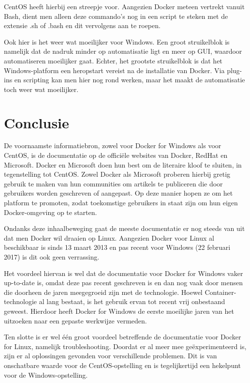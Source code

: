 CentOS heeft hierbij een streepje voor. Aangezien Docker meteen vertrekt vanuit Bash, dient men alleen deze commando's nog in een script te steken met de extensie .sh of .bash en dit vervolgens aan te roepen.

Ook hier is het weer wat moeilijker voor Windows. Een groot struikelblok is namelijk dat de nadruk minder op automatisatie ligt en meer op GUI, waardoor automatiseren moeilijker gaat. Echter, het grootste struikelblok is dat het Windows-platform een heropstart vereist na de installatie van Docker. Via plug-ins en scripting kan men hier nog rond werken, maar het maakt de automatisatie toch weer wat moeilijker.

\section{Conclusie}
De voornaamste informatiebron, zowel voor Docker for Windows als voor CentOS, is de documentatie op de officiële websites van Docker, RedHat en Microsoft. Docker en Microsoft doen hun best om de literaire kloof te sluiten, in tegenstelling tot CentOS. Zowel Docker als Microsoft proberen hierbij gretig gebruik te maken van hun communities om artikels te publiceren die door gebruikers worden geschreven of aangepast. Op deze manier hopen ze om het platform te promoten, zodat toekomstige gebruikers in staat zijn om hun eigen Docker-omgeving op te starten.

Ondanks deze inhaalbeweging gaat de meeste documentatie er nog steeds van uit dat men Docker wil draaien op Linux. Aangezien Docker voor Linux al beschikbaar is sinds 13 maart 2013 en pas recent voor Windows (22 februari 2017) is dit ook geen verrassing.

Het voordeel hiervan is wel dat de documentatie voor Docker for Windows vaker up-to-date is, omdat deze pas recent geschreven is en dan nog vaak door mensen die doorheen de jaren meegegroeid zijn met de technologie. Hoewel Container-technologie al lang bestaat, is het gebruik ervan tot recent vrij onbestaand geweest. Hierdoor heeft Docker for Windows de eerste moeilijke jaren van het uitzoeken naar een gepaste werkwijze vermeden. 

Ten slotte is er wel één groot voordeel betreffende de documentatie voor Docker for Linux, namelijk troubleshooting. Doordat er al meer mee geëxperimenteerd is, zijn er al oplossingen gevonden voor verschillende problemen. Dit is van onschatbare waarde voor de CentOS-opstelling en is tegelijkertijd een hekelpunt voor de Windows-opstelling.